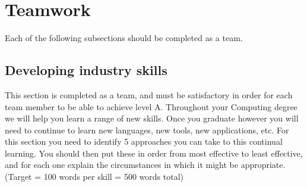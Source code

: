 \documentclass[a4paper, 11pt]{report}
\begin{document}

\tableofcontents





\newpage
\section{Teamwork}
\label{sect-team}

Each of the following subsections should be completed as a team.

\subsection{Developing industry skills}

This section is completed as a team, and must be satisfactory in order for each team member to be able to achieve level A. Throughout your Computing degree we will help you learn a range of new skills. Once you graduate however you will need to continue to learn new languages, new tools, new applications, etc. For this section you need to identify 5 approaches you can take to this continual learning. You should then put these in order from most effective to least effective, and for each one explain the circumstances in which it might be appropriate. (Target = 100 words per skill = 500 words total)
\end{document}

